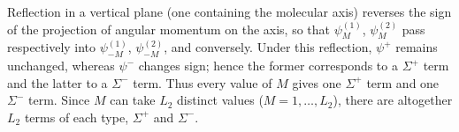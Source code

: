 Reflection in a vertical plane (one containing the molecular axis) reverses the sign of the projection of angular momentum on the axis, so that $\psi_M^{(1)}$, $\psi_M^{(2)}$ pass respectively into $\psi_{-M}^{(1)}$, $\psi_{-M}^{(2)}$, and conversely.
Under this reflection, $\psi^+$ remains unchanged, whereas $\psi^-$ changes sign; hence the former corresponds to a $\Sigma^+$ term and the latter to a $\Sigma^-$ term.
Thus every value of $M$ gives one $\Sigma^+$ term and one $\Sigma^-$ term.
Since $M$ can take $L_2$ distinct values ($M=1,\ldots,L_2$), there are altogether $L_2$ terms of each type, $\Sigma^+$ and $\Sigma^-$.
